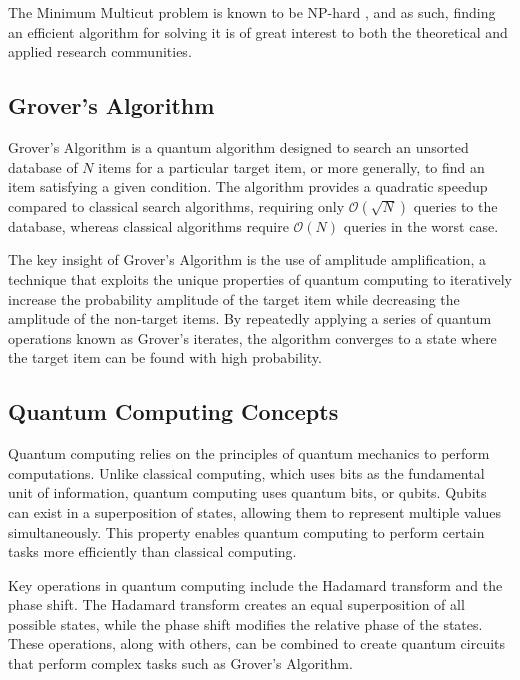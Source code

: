 The Minimum Multicut problem is known to be NP-hard \cite{garey1979computers}, and as such, finding an efficient algorithm for solving it is of great interest to both the theoretical and applied research communities.

\subsection{Grover's Algorithm}\label{subsec:grover}

Grover's Algorithm \cite{grover1996fast} is a quantum algorithm designed to search an unsorted database of $N$ items for a particular target item, or more generally, to find an item satisfying a given condition. The algorithm provides a quadratic speedup compared to classical search algorithms, requiring only $\mathcal{O}(\sqrt{N})$ queries to the database, whereas classical algorithms require $\mathcal{O}(N)$ queries in the worst case.

The key insight of Grover's Algorithm is the use of amplitude amplification, a technique that exploits the unique properties of quantum computing to iteratively increase the probability amplitude of the target item while decreasing the amplitude of the non-target items. By repeatedly applying a series of quantum operations known as Grover's iterates, the algorithm converges to a state where the target item can be found with high probability.

\subsection{Quantum Computing Concepts}\label{subsec:quantum_concepts}

Quantum computing relies on the principles of quantum mechanics to perform computations. Unlike classical computing, which uses bits as the fundamental unit of information, quantum computing uses quantum bits, or qubits. Qubits can exist in a superposition of states, allowing them to represent multiple values simultaneously. This property enables quantum computing to perform certain tasks more efficiently than classical computing.

Key operations in quantum computing include the Hadamard transform and the phase shift. The Hadamard transform creates an equal superposition of all possible states, while the phase shift modifies the relative phase of the states. These operations, along with others, can be combined to create quantum circuits that perform complex tasks such as Grover's Algorithm.

